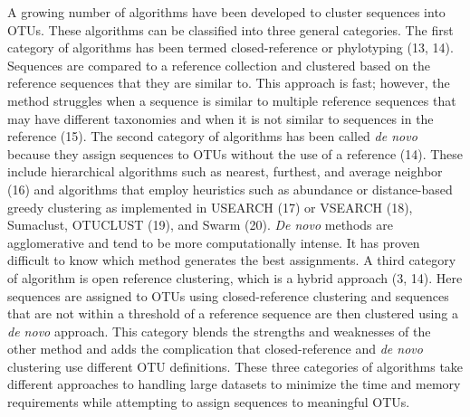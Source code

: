 \documentclass[11pt,]{article}
\begin{document}
A growing number of algorithms have been developed to cluster sequences
into OTUs. These algorithms can be classified into three general
categories. The first category of algorithms has been termed
closed-reference or phylotyping (13, 14). Sequences are compared to a
reference collection and clustered based on the reference sequences that
they are similar to. This approach is fast; however, the method
struggles when a sequence is similar to multiple reference sequences
that may have different taxonomies and when it is not similar to
sequences in the reference (15). The second category of algorithms has
been called \emph{de novo} because they assign sequences to OTUs without
the use of a reference (14). These include hierarchical algorithms such
as nearest, furthest, and average neighbor (16) and algorithms that
employ heuristics such as abundance or distance-based greedy clustering
as implemented in USEARCH (17) or VSEARCH (18), Sumaclust, OTUCLUST
(19), and Swarm (20). \emph{De novo} methods are agglomerative and tend
to be more computationally intense. It has proven difficult to know
which method generates the best assignments. A third category of
algorithm is open reference clustering, which is a hybrid approach (3,
14). Here sequences are assigned to OTUs using closed-reference
clustering and sequences that are not within a threshold of a reference
sequence are then clustered using a \emph{de novo} approach. This
category blends the strengths and weaknesses of the other method and
adds the complication that closed-reference and \emph{de novo}
clustering use different OTU definitions. These three categories of
algorithms take different approaches to handling large datasets to
minimize the time and memory requirements while attempting to assign
sequences to meaningful OTUs.
\end{document}
